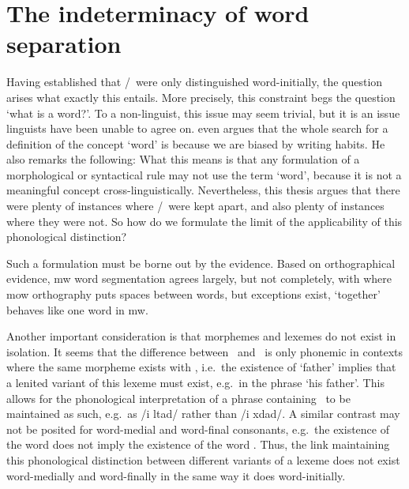 \section{The indeterminacy of word separation}
Having established that \lT/\xD\ were only distinguished word-initially, the question arises what exactly this entails. More precisely, this constraint begs the question `what is a word?'. To a non-linguist, this issue may seem trivial, but it is an issue linguists have been unable to agree on. \Textcite[28]{haspelmath_indeterminacy_2011} even argues that the whole search for a definition of the concept `word' is because we are biased by writing habits. He also remarks the following: 
What this means is that any formulation of a morphological or syntactical rule may not use the term `word', because it is not a meaningful concept cross-linguistically. 
Nevertheless, this thesis argues that there were plenty of instances where \lT/\xD\ were kept apart, and also plenty of instances where they were not. 
So how do we formulate the limit of the applicability of this phonological distinction?

Such a formulation must be borne out by the evidence. Based on orthographical evidence, \gls{mw} word segmentation agrees largely, but not completely, with where \gls{mow} orthography puts spaces between words, but exceptions exist, \eg {} `together' behaves like one word in \gls{mw}.

Another important consideration is that morphemes and lexemes do not exist in isolation. 
It seems that the difference between \lT\ and \xD\ is only phonemic in contexts where the same morpheme exists with \xT, i.e.\ the existence of  `father' implies that a lenited variant of this lexeme must exist, e.g.\ in the phrase  `his father'. This allows for the phonological interpretation of a phrase containing \lT\ to be maintained as such, e.g.\ as /i \gls{l}tad/ rather than /i \gls{x}dad/. A similar contrast may not be posited for word-medial and word-final consonants, e.g.\ the existence of the word  does not imply the existence of the word . Thus, the link maintaining this phonological distinction between different variants of a lexeme does not exist word-medially and word-finally in the same way it does word-initially.

